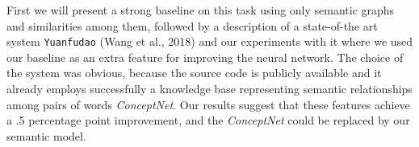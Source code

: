 First we will present a strong baseline on this task using only semantic graphs and similarities among them, followed by 
a description of a state-of-the art system \texttt{Yuanfudao} (Wang et al., 2018) and our experiments with it where
we used our baseline as an extra feature for improving the neural network. The choice of the system was obvious, because the source code is publicly
available
and it already employs successfully
a knowledge base representing semantic
relationships among pairs of words \textit{ConceptNet}.
Our results
suggest that these features achieve a .5
percentage point improvement, and the \textit{ConceptNet} could be replaced by our semantic model.
\vfill

